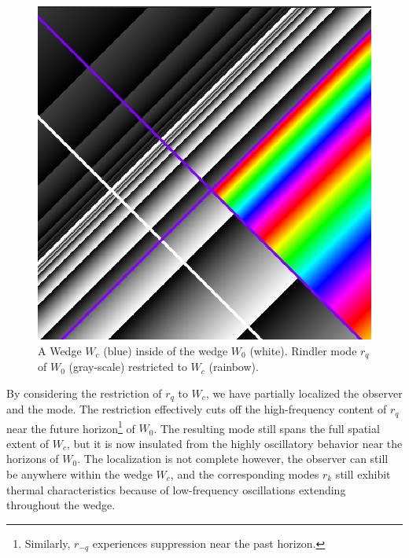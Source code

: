 \documentclass[12pt,a4paper]{article}
\begin{document}
\begin{figure}[h]
  \centering
\includegraphics[scale=0.4]{wedge_in_wedge.png}
\caption{A Wedge $W_c$ (blue) inside of the wedge $W_0$ (white). Rindler mode $r_q$ of $W_0$ (gray-scale) restricted to $W_c$ (rainbow).}
\label{restrict}
\end{figure}

By considering the restriction of $r_q$ to $W_c$, we have partially localized the observer and the mode. The restriction effectively cuts off the high-frequency content of $r_q$ near the future horizon\footnote{Similarly, $r_{-q}$ experiences suppression near the past horizon.} of $W_0$. The resulting mode still spans the full spatial extent of $W_c$, but it is now insulated from the highly oscillatory behavior near the horizons of $W_0$.  The localization is not complete however, the observer can still be anywhere within the wedge $W_c$, and the corresponding modes $r_k$ still exhibit thermal characteristics because of low-frequency oscillations extending throughout the wedge.
\end{document}
